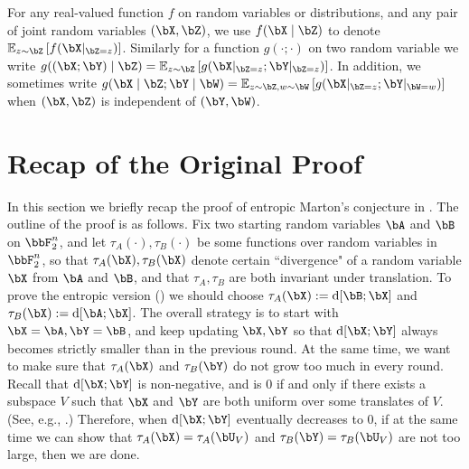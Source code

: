 \documentclass{article}
\DeclarePairedDelimiter{\sqpar}{[}{]}
\newcommand{\Ruz}{\mathrm{d}\sqpar}
\begin{document}
For any real-valued function $f$ on random variables or distributions, and any pair of joint random variables $(\bX,\bZ)$, we use $f(\bX\mid\bZ)$ to denote $\ex[z\sim\bZ]{f(\bX|_{\bZ=z})}$. Similarly for a function $g(\cdot;\cdot)$ on two random variable we write $g((\bX;\bY)\mid\bZ)=\ex[z\sim\bZ]{g(\bX|_{\bZ=z};\bY|_{\bZ=z})}$. In addition, we sometimes write $g(\bX\mid \bZ ;\bY\mid \bW)=\ex[z\sim\bZ,w\sim\bW]{g(\bX|_{\bZ=z};\bY|_{\bW=w})}$ when $(\bX,\bZ)$ is independent of $(\bY,\bW)$.



\section{Recap of the Original Proof}
In this section we briefly recap the proof of entropic Marton's conjecture in \cite{GGMT23}. The outline of the proof is as follows. Fix two starting random variables $\bA$ and $\bB$ on $\bbF_2^n$, and let $\tau_A(\cdot),\tau_B(\cdot)$ be some functions over random variables in $\bbF_2^n$, so that $\tau_A(\bX),\tau_B(\bX)$ denote certain ``divergence" of a random variable $\bX$ from $\bA$ and $\bB$, and that $\tau_A,\tau_B$ are both invariant under translation. To prove the entropic version () we should choose $\tau_A(\bX):=\Ruz{\bB;\bX}$ and $\tau_B(\bX):=\Ruz{\bA;\bX}$. The overall strategy is to start with $\bX=\bA,\bY=\bB$, and keep updating $\bX,\bY$ so that $\Ruz{\bX;\bY}$ always becomes strictly smaller than in the previous round. At the same time, we want to make sure that $\tau_A(\bX)$ and $\tau_B(\bY)$ do not grow too much in every round. Recall that $\Ruz{\bX;\bY}$ is non-negative, and is $0$ if and only if there exists a subspace $V$ such that $\bX$ and $\bY$ are both uniform over some translates of $V$. (See, e.g., \cite[Theorem 1.11]{Tao10}.) Therefore, when $\Ruz{\bX;\bY}$ eventually decreases to $0$, if at the same time we can show that $\tau_A(\bX)=\tau_A(\bU_V)$ and $\tau_B(\bY)=\tau_B(\bU_V)$ are not too large, then we are done. 
\end{document}
